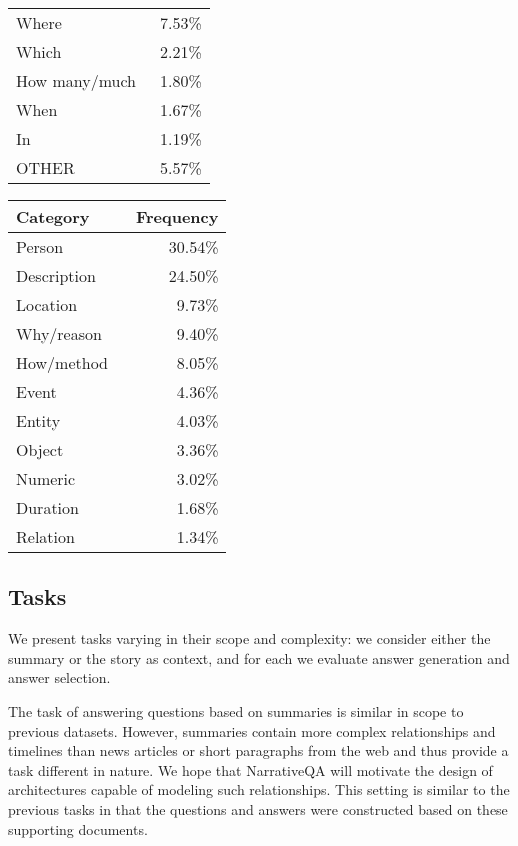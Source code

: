 \documentclass[11pt,letterpaper]{article}
\begin{document}
\begin{table*}[t]
\begin{minipage}[t]{.25\linewidth}
\begin{tabular}[t]{@{}lr@{}}
    Where&	~7.53\% \\
    Which&	~2.21\% \\
    How many/much& 1.80\% \\
    When&	~1.67\% \\
    In&	    ~1.19\% \\
    OTHER& ~5.57\% \\
    \bottomrule
\end{tabular}
\caption{Frequency of first token of the question in the training set.}
\label{tab:first_token}
\end{minipage}\hfill
\begin{minipage}[t]{.24\linewidth}
\small
\footnotesize
\centering
\begin{tabular}[t]{@{}lr@{}}
    \toprule
    \textbf{Category} & \textbf{Frequency} \\
    \midrule
Person	&30.54\%  \\
Description~~~	&24.50\%  \\
Location	&~9.73\%  \\
Why/reason	&~9.40\%  \\
How/method	&~8.05\%  \\
Event	&~4.36\%  \\
Entity	&~4.03\%  \\
Object	&~3.36\%  \\
Numeric	&~3.02\%  \\
Duration	&~1.68\%  \\
Relation	&~1.34\%  \\
\bottomrule
\end{tabular}
\caption{Question categories on a sample of 300 questions from the validation set.}
\label{tab:question_categories}
\end{minipage}
\end{table*}




\subsection{Tasks}

We present
tasks varying in their scope and complexity: we consider either the summary or the story as context, and for each we evaluate answer generation and answer selection.

The task of answering questions based on summaries
is similar  in  scope  to previous datasets. However, summaries contain more complex relationships and timelines
than news articles or short paragraphs from the web and thus provide a task different in nature.
We hope that NarrativeQA will motivate the design of
architectures capable of modeling such relationships.
This setting is similar to the previous tasks in
that the questions and answers were constructed based on these supporting documents.
\end{document}
